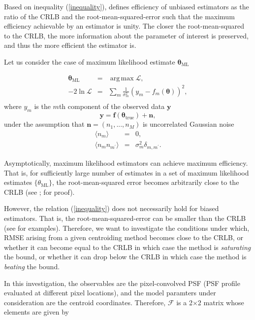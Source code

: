 \documentclass[12pt, preprint]{aastex}
\DeclareMathOperator*{\argmax}{arg\,max}
\newcommand{\beq}{\begin{equation}}
\newcommand{\eeq}{\end{equation}}
\begin{document}
Based on inequality (\ref{inequality}), \citet{cramer} defines efficiency of unbiased 
estimators as the ratio of the CRLB and the root-mean-squared-error such that the maximum efficiency 
achievable by an estimator is unity. The closer the root-mean-squared 
to the CRLB, the more information about the parameter of interest is preserved, and thus the more efficient 
the estimator is. 

Let us consider the case of maximum likelihood estimate $\boldsymbol{\mathbf{\theta}}_{\text{ML}}$

\begin{eqnarray}
\boldsymbol{\mathbf{\theta}}_{\text{ML}} &=& \argmax \mathcal{L}, \\
-2\ln \mathcal{L} &=& \sum_{m}\frac{1}{\sigma_{m}^{2}}( y_{m} - f_{m}(\boldsymbol{\mathbf{\theta}}))^{2}, \\
\end{eqnarray}
where $y_{m}$ is the $m$th component of the observed data $\mathbf{y}$
\beq
\mathbf{y} = \mathbf{f}(\boldsymbol{\mathbf{\theta}}_{\text{true}}) + \mathbf{n},
\eeq
under the assumption that $\mathbf{n} = (n_{1}, ... , n_{M})$ is uncorrelated Gaussian noise
\begin{eqnarray}
\langle n_{m} \rangle &=& 0, \\
\langle n_{m}n_{m^{\prime}} \rangle &=& \sigma_{m}^{2}\delta_{m,m^{\prime}}. 
\end{eqnarray}

Asymptotically, maximum likelihood estimators can achieve maximum efficiency. That is, for sufficiently large 
number of estimates in a set of maximum likelihood estimates $\{\theta_{\text{ML}}\}$, the root-mean-squared 
error becomes arbitrarily close to the CRLB (see \citet{cramer}; \citet{lecam} for proof). 

However, the relation (\ref{inequality}) does not necessarily hold for biased estimators. That is, 
the root-mean-squared-error can be smaller than the CRLB (see \citet{lecam} for examples).
Therefore, we want to investigate the conditions under which, RMSE arising from a given centroiding method 
becomes close to the CRLB, or whether it can become equal to the CRLB in which case the method is \emph{saturating} 
the bound, or whether it can drop below the CRLB in which case the method is \emph{beating} the bound.   
  
In this investigation, the observables are the pixel-convolved PSF (PSF profile evaluated at different pixel locations), and  
the model paramters under consideration are the centroid coordinates. Therefore, $\mathcal{F}$
is a 2$\times$2 matrix whose elements are given by
\end{document}
